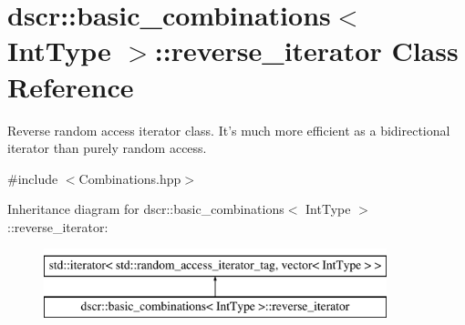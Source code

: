 \hypertarget{classdscr_1_1basic__combinations_1_1reverse__iterator}{\section{dscr\-:\-:basic\-\_\-combinations$<$ Int\-Type $>$\-:\-:reverse\-\_\-iterator Class Reference}
\label{classdscr_1_1basic__combinations_1_1reverse__iterator}
}


Reverse random access iterator class. It's much more efficient as a bidirectional iterator than purely random access.  




{\ttfamily \#include $<$Combinations.\-hpp$>$}

Inheritance diagram for dscr\-:\-:basic\-\_\-combinations$<$ Int\-Type $>$\-:\-:reverse\-\_\-iterator\-:\begin{figure}[H]
\begin{center}
\leavevmode
\includegraphics[height=2.000000cm]{classdscr_1_1basic__combinations_1_1reverse__iterator}
\end{center}
\end{figure}
